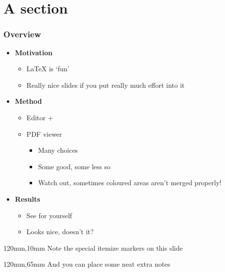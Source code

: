 \documentclass[mathserif, fleqn, aspectratio=169]{beamer}
\begin{document}
\begin{frame}
  \titlepage
\end{frame}

\section{A section}
\begin{frame}\frametitle{Overview}

  \begin{itemize}\setlength{\itemsep}{1.5ex}
  \item \textbf{Motivation}
    \begin{itemize}\setlength{\itemsep}{1ex}
    \item \LaTeX{} is `fun'
    \item Really nice slides if you put really much effort into it
    \end{itemize}
  \item \textbf{Method}
    \begin{itemize}\setlength{\itemsep}{1ex}
    \item Editor + \XeLaTeX
    \item PDF viewer
      \begin{itemize}
      \item Many choices
      \item Some good, some less so
      \item Watch out, sometimes coloured areas aren't merged properly!
      \end{itemize}
    \end{itemize}
  \item \textbf{Results}
    \begin{itemize}\setlength{\itemsep}{1ex}
    \item See for yourself
    \item Looks nice, doesn't it?
    \end{itemize}
  \end{itemize}

  \begin{aside}{30mm}{120mm,10mm}
    Note the special itemize markers on this slide
  \end{aside}

  \begin{aside}{30mm}{120mm,65mm}
    And you can place some neat extra notes
  \end{aside}
\end{frame}
\end{document}
